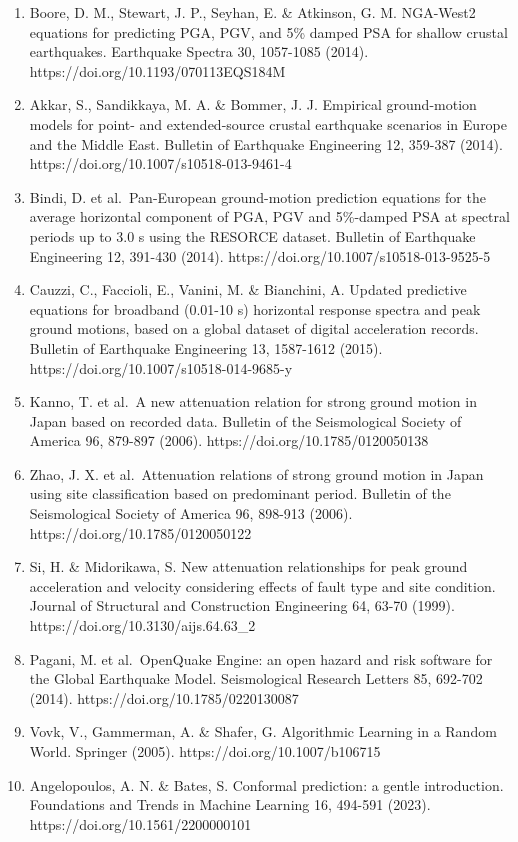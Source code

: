 \documentclass[
  10pt,
]{article}
\begin{document}
\begin{enumerate}
  C. Earthquake transformer - an attentive deep-learning model for
  simultaneous earthquake detection and phase picking. Nature
  Communications 11, 3952 (2020).
  https://doi.org/10.1038/s41467-020-17591-w
\item
  Boore, D. M., Stewart, J. P., Seyhan, E. \& Atkinson, G. M. NGA-West2
  equations for predicting PGA, PGV, and 5\% damped PSA for shallow
  crustal earthquakes. Earthquake Spectra 30, 1057-1085 (2014).
  https://doi.org/10.1193/070113EQS184M
\item
  Akkar, S., Sandikkaya, M. A. \& Bommer, J. J. Empirical ground-motion
  models for point- and extended-source crustal earthquake scenarios in
  Europe and the Middle East. Bulletin of Earthquake Engineering 12,
  359-387 (2014). https://doi.org/10.1007/s10518-013-9461-4
\item
  Bindi, D. et al.~Pan-European ground-motion prediction equations for
  the average horizontal component of PGA, PGV and 5\%-damped PSA at
  spectral periods up to 3.0 s using the RESORCE dataset. Bulletin of
  Earthquake Engineering 12, 391-430 (2014).
  https://doi.org/10.1007/s10518-013-9525-5
\item
  Cauzzi, C., Faccioli, E., Vanini, M. \& Bianchini, A. Updated
  predictive equations for broadband (0.01-10 s) horizontal response
  spectra and peak ground motions, based on a global dataset of digital
  acceleration records. Bulletin of Earthquake Engineering 13, 1587-1612
  (2015). https://doi.org/10.1007/s10518-014-9685-y
\item
  Kanno, T. et al.~A new attenuation relation for strong ground motion
  in Japan based on recorded data. Bulletin of the Seismological Society
  of America 96, 879-897 (2006). https://doi.org/10.1785/0120050138
\item
  Zhao, J. X. et al.~Attenuation relations of strong ground motion in
  Japan using site classification based on predominant period. Bulletin
  of the Seismological Society of America 96, 898-913 (2006).
  https://doi.org/10.1785/0120050122
\item
  Si, H. \& Midorikawa, S. New attenuation relationships for peak ground
  acceleration and velocity considering effects of fault type and site
  condition. Journal of Structural and Construction Engineering 64,
  63-70 (1999). https://doi.org/10.3130/aijs.64.63\_2
\item
  Pagani, M. et al.~OpenQuake Engine: an open hazard and risk software
  for the Global Earthquake Model. Seismological Research Letters 85,
  692-702 (2014). https://doi.org/10.1785/0220130087
\item
  Vovk, V., Gammerman, A. \& Shafer, G. Algorithmic Learning in a Random
  World. Springer (2005). https://doi.org/10.1007/b106715
\item
  Angelopoulos, A. N. \& Bates, S. Conformal prediction: a gentle
  introduction. Foundations and Trends in Machine Learning 16, 494-591
  (2023). https://doi.org/10.1561/2200000101
\end{enumerate}
\end{document}
